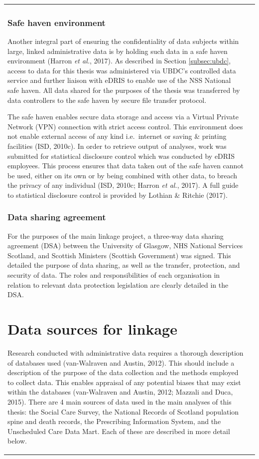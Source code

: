 \documentclass[12pt,a4paper,oneside,table]{report}
\begin{document}
\begin{tabular}[t]{ll}
\subsubsection{Safe haven environment}\label{subsec:safe-haven}

Another integral part of ensuring the confidentiality of data subjects
within large, linked administrative data is by holding such data in a
safe haven environment (Harron \emph{et al.}, 2017). As described in
Section \ref{subsec:ubdc}, access to data for this thesis was
administered via UBDC's controlled data service and further liaison with
eDRIS to enable use of the NSS National safe haven. All data shared for
the purposes of the thesis was transferred by data controllers to the
safe haven by secure file transfer protocol.

The safe haven enables secure data storage and access via a Virtual
Private Network (VPN) connection with strict access control. This
environment does not enable external access of any kind i.e.~internet or
saving \& printing facilities (ISD, 2010c). In order to retrieve output
of analyses, work was submitted for statistical disclosure control which
was conducted by eDRIS employees. This process ensures that data taken
out of the safe haven cannot be used, either on its own or by being
combined with other data, to breach the privacy of any individual (ISD,
2010c; Harron \emph{et al.}, 2017). A full guide to statistical
disclosure control is provided by Lothian \& Ritchie (2017).

\subsubsection{Data sharing agreement}\label{subsec:dsa}

For the purposes of the main linkage project, a three-way data sharing
agreement (DSA) between the University of Glasgow, NHS National Services
Scotland, and Scottish Ministers (Scottish Government) was signed. This
detailed the purpose of data sharing, as well as the transfer,
protection, and security of data. The roles and responsibilities of each
organisation in relation to relevant data protection legislation are
clearly detailed in the DSA.

\section{Data sources for linkage}\label{sec:sources}

Research conducted with administrative data requires a thorough
description of databases used (van-Walraven and Austin, 2012). This
should include a description of the purpose of the data collection and
the methods employed to collect data. This enables appraisal of any
potential biases that may exist within the databases (van-Walraven and
Austin, 2012; Mazzali and Duca, 2015). There are 4 main sources of data
used in the main analyses of this thesis: the Social Care Survey, the
National Records of Scotland population spine and death records, the
Prescribing Information System, and the Unscheduled Care Data Mart. Each
of these are described in more detail below.


\end{tabular}
\end{document}
